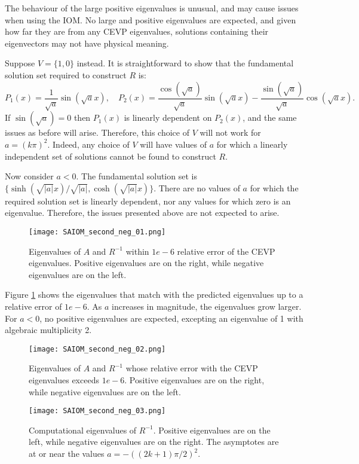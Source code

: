 \documentclass{sfuthesis}
\begin{document}
The behaviour of the large positive eigenvalues is unusual, and may cause issues when using the IOM.
No large and positive eigenvalues are expected, and given how far they are from any CEVP eigenvalues, solutions containing their eigenvectors may not have physical meaning.

Suppose $V = \{ 1, 0\}$ instead.
It is straightforward to show that the fundamental solution set required to construct $R$ is:
\begin{equation}
P_1(x) = \frac{1}{\sqrt{a}} \sin(\sqrt{a}x), \quad P_2(x) = \frac{\cos(\sqrt{a})}{\sqrt{a}} \sin(\sqrt{a}x) - \frac{\sin(\sqrt{a})}{\sqrt{a}} \cos(\sqrt{a}x).
\end{equation}
If $\sin(\sqrt{a}) = 0$ then $P_1(x)$ is linearly dependent on $P_2(x)$, and the same issues as before will arise.
Therefore, this choice of $V$ will not work for $a = (k \pi)^2$.
Indeed, any choice of $V$ will have values of $a$ for which a linearly independent set of solutions cannot be found to construct $R$.

Now consider $a<0$.
The fundamental solution set is $\{ \sinh( \sqrt{|a|} x)/\sqrt{|a|}, \cosh(\sqrt{|a|} x) \}$.
There are no values of $a$ for which the required solution set is linearly dependent, nor any values for which zero is an eigenvalue.
Therefore, the issues presented above are not expected to arise.

\begin{figure}
\texttt{[image: SAIOM\_second\_neg\_01.png]}
\caption{Eigenvalues of $A$ and $R^{-1}$ within $1e-6$ relative error of the CEVP eigenvalues. Positive eigenvalues are on the right, while negative eigenvalues are on the left.}
\label{fig:SAIOM_2_neg 1}
\end{figure}

Figure \ref{fig:SAIOM_2_neg 1} shows the eigenvalues that match with the predicted eigenvalues up to a relative error of $1e-6$.
As $a$ increases in magnitude, the eigenvalues grow larger.
For $a<0$, no positive eigenvalues are expected, excepting an eigenvalue of 1 with algebraic multiplicity 2.

\begin{figure}
\texttt{[image: SAIOM\_second\_neg\_02.png]}
\caption{Eigenvalues of $A$ and $R^{-1}$ whose relative error with the CEVP eigenvalues exceeds $1e-6$. Positive eigenvalues are on the right, while negative eigenvalues are on the left.}
\label{fig:SAIOM_2_neg 2}
\end{figure}

\begin{figure}
\texttt{[image: SAIOM\_second\_neg\_03.png]}
\caption{Computational eigenvalues of $R^{-1}$. Positive eigenvalues are on the left, while negative eigenvalues are on the right. The asymptotes are at or near the values $a = - ( (2k+1) \pi / 2)^2$.}
\label{fig:SAIOM_2_neg 3}
\end{figure}
\end{document}
